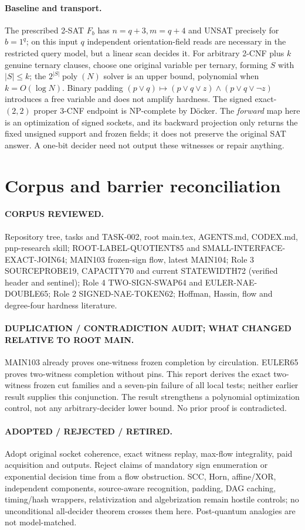 \documentclass[11pt]{article}
\begin{document}
\paragraph{Baseline and transport.}
The prescribed 2-SAT $F_b$ has $n=q+3,m=q+4$ and UNSAT precisely for $b=1^q$; on this input $q$ independent orientation-field reads are necessary in the restricted query model, but a linear scan decides it. For arbitrary 2-CNF plus $k$ genuine ternary clauses, choose one original variable per ternary, forming $S$ with $|S|\le k$; the $2^{|S|}\operatorname{poly}(N)$ solver is an upper bound, polynomial when $k=O(\log N)$. Binary padding $(p\vee q)\mapsto(p\vee q\vee z)\wedge(p\vee q\vee\neg z)$ introduces a free variable and does not amplify hardness. The signed exact-$(2,2)$ proper 3-CNF endpoint is NP-complete by D\"ocker. The \emph{forward} map here is an optimization of signed sockets, and its backward projection only returns the fixed unsigned support and frozen fields; it does not preserve the original SAT answer. A one-bit decider need not output these witnesses or repair anything.
\section{Corpus and barrier reconciliation}
\paragraph{CORPUS REVIEWED.}
Repository tree, tasks and TASK-002, root main.tex, AGENTS.md, CODEX.md, pnp-research skill; ROOT-LABEL-QUOTIENT85 and SMALL-INTERFACE-EXACT-JOIN64; MAIN103 frozen-sign flow, latest MAIN104; Role 3 SOURCEPROBE19, CAPACITY70 and current STATEWIDTH72 (verified header and sentinel); Role 4 TWO-SIGN-SWAP64 and EULER-NAE-DOUBLE65; Role 2 SIGNED-NAE-TOKEN62; Hoffman, Hassin, flow and degree-four hardness literature.
\paragraph{DUPLICATION / CONTRADICTION AUDIT; WHAT CHANGED RELATIVE TO ROOT MAIN.}
MAIN103 already proves one-witness frozen completion by circulation. EULER65 proves two-witness completion without pins. This report derives the exact two-witness frozen cut families and a seven-pin failure of all local tests; neither earlier result supplies this conjunction. The result strengthens a polynomial optimization control, not any arbitrary-decider lower bound. No prior proof is contradicted.
\paragraph{ADOPTED / REJECTED / RETIRED.}
Adopt original socket coherence, exact witness replay, max-flow integrality, paid acquisition and outputs. Reject claims of mandatory sign enumeration or exponential decision time from a flow obstruction. SCC, Horn, affine/XOR, independent components, source-aware recognition, padding, DAG caching, timing/hash wrappers, relativization and algebrization remain hostile controls; no unconditional all-decider theorem crosses them here. Post-quantum analogies are not model-matched.
\end{document}
